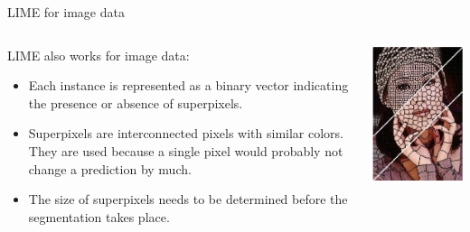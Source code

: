 \documentclass[11pt,compress,t,notes=noshow, xcolor=table]{beamer}
\begin{document}
	\begin{vbframe}{LIME for image data}
	\begin{columns}
		\begin{column}{0.67\textwidth}
			LIME also works for image data:  
			\begin{itemize}
				\item Each instance is represented as a binary vector indicating the presence or absence of superpixels. 
				\item Superpixels are interconnected pixels with similar colors. They are used because a single pixel would probably not change a prediction by much.
				\item The size of superpixels needs to be determined before the segmentation takes place.
			\end{itemize}		
		\end{column}
		\begin{column}{0.26\textwidth}  
			\begin{center}
				\includegraphics[width=1\textwidth]{figure/superpixel_woman}

\end{center}
\end{column}
\end{columns}
\end{vbframe}
\end{document}
